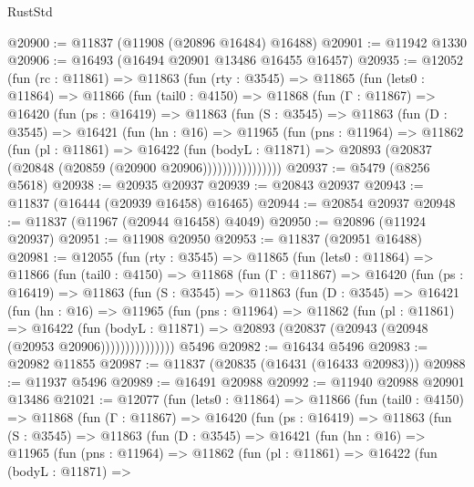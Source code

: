\begin{lexlean}{RustStd}
\begin{coremodule}
@20900 := @11837 (@11908 (@20896 @16484) @16488)
@20901 := @11942 @1330
@20906 := @16493 (@16494 @20901 @13486 @16455 @16457)
@20935 := @12052
    (fun (rc : @11861) =>
    @11863
      (fun (rty : @3545) =>
      @11865
        (fun (lets0 : @11864) =>
        @11866
          (fun (tail0 : @4150) =>
          @11868
            (fun (Γ : @11867) =>
            @16420
              (fun (ps : @16419) =>
              @11863
                (fun (S : @3545) =>
                @11863
                  (fun (D : @3545) =>
                  @16421
                    (fun (hn : @16) =>
                    @11965
                      (fun (pns : @11964) =>
                      @11862
                        (fun (pl : @11861) =>
                        @16422
                          (fun (bodyL : @11871) =>
                          @20893 (@20837 (@20848 (@20859 (@20900 @20906))))))))))))))))
@20937 := @5479 (@8256 @5618)
@20938 := @20935 @20937
@20939 := @20843 @20937
@20943 := @11837 (@16444 (@20939 @16458) @16465)
@20944 := @20854 @20937
@20948 := @11837 (@11967 (@20944 @16458) @4049)
@20950 := @20896 (@11924 @20937)
@20951 := @11908 @20950
@20953 := @11837 (@20951 @16488)
@20981 := @12055
    (fun (rty : @3545) =>
    @11865
      (fun (lets0 : @11864) =>
      @11866
        (fun (tail0 : @4150) =>
        @11868
          (fun (Γ : @11867) =>
          @16420
            (fun (ps : @16419) =>
            @11863
              (fun (S : @3545) =>
              @11863
                (fun (D : @3545) =>
                @16421
                  (fun (hn : @16) =>
                  @11965
                    (fun (pns : @11964) =>
                    @11862
                      (fun (pl : @11861) =>
                      @16422
                        (fun (bodyL : @11871) =>
                        @20893 (@20837 (@20943 (@20948 (@20953 @20906)))))))))))))))
    @5496
@20982 := @16434 @5496
@20983 := @20982 @11855
@20987 := @11837 (@20835 (@16431 (@16433 @20983)))
@20988 := @11937 @5496
@20989 := @16491 @20988
@20992 := @11940 @20988 @20901 @13486
@21021 := @12077
    (fun (lets0 : @11864) =>
    @11866
      (fun (tail0 : @4150) =>
      @11868
        (fun (Γ : @11867) =>
        @16420
          (fun (ps : @16419) =>
          @11863
            (fun (S : @3545) =>
            @11863
              (fun (D : @3545) =>
              @16421
                (fun (hn : @16) =>
                @11965
                  (fun (pns : @11964) =>
                  @11862
                    (fun (pl : @11861) =>
                    @16422
                      (fun (bodyL : @11871) =>

\end{coremodule}
\end{lexlean}
